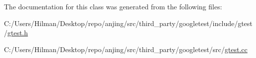 The documentation for this class was generated from the following files\+:\begin{DoxyCompactItemize}
\item 
C\+:/\+Users/\+Hilman/\+Desktop/repo/anjing/src/third\+\_\+party/googletest/include/gtest/\hyperlink{gtest_8h}{gtest.\+h}\item 
C\+:/\+Users/\+Hilman/\+Desktop/repo/anjing/src/third\+\_\+party/googletest/src/\hyperlink{gtest_8cc}{gtest.\+cc}\end{DoxyCompactItemize}
